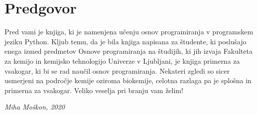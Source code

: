 \chapter*{Predgovor}

Pred vami je knjiga, ki je namenjena učenju osnov programiranja v programskem jeziku Python. Kljub temu, da je bila knjiga napisana za študente, ki poslušajo enega izmed predmetov Osnove programiranja na študijih, ki jih izvaja Fakulteta za kemijo in kemijsko tehnologijo Univerze v Ljubljani, je knjiga primerna za vsakogar, ki bi se rad naučil osnov programiranja. Nekateri zgledi so sicer usmerjeni na področje kemije oziroma biokemije, celotna razlaga pa je splošna in primerna za vsakogar. Veliko veselja pri branju vam želim!

\begin{flushright}
\textit{Miha Moškon, 2020}
\end{flushright}
